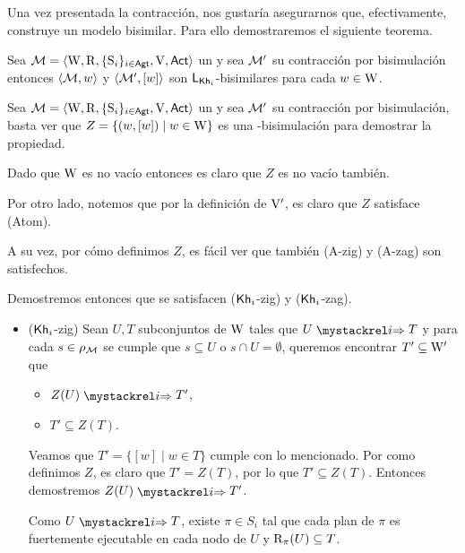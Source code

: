 Una vez presentada la contracción, nos gustaría asegurarnos que, efectivamente, construye un modelo bisimilar. Para ello demostraremos el 
siguiente teorema.

\begin{teorema}
    Sea $\mathcal{M}=\langle \mathrm{W},\mathrm{R},\{ \mathrm{S}_i \}_{i \in {\rm \sf Agt}},\mathrm{V},{\rm \sf Act} \rangle$ un \ults y sea $\mathcal{M}'$ su contracción por bisimulación entonces 
    $\langle \mathcal{M},w \rangle$ y $\langle \mathcal{M}',[w] \rangle$ son $\mathsf{L}_{\mathsf{Kh}_i}$-bisimilares para cada $w \in \mathrm{W}$.
\end{teorema}

\begin{demostracion}
    Sea $\mathcal{M}=\langle \mathrm{W},\mathrm{R},\{ \mathrm{S}_i \}_{i \in {\rm \sf Agt}},\mathrm{V},{\rm \sf Act} \rangle$ un \ults
    y sea $\mathcal{M}'$ su contracción por bisimulación, basta ver que $Z = \{(w,[w]) \mid w \in\mathrm{W}\}$ es una \KHilogic-bisimulación para demostrar la propiedad.

    Dado que $\mathrm{W}$ es no vacío entonces es claro que $Z$ es no vacío también.

    Por otro lado, notemos que por la definición de $\mathrm{V}'$, es claro que $Z$ satisface (Atom).

    A su vez, por cómo definimos $Z$, es fácil ver que también (A-zig) y (A-zag) son satisfechos.
    
    Demostremos entonces que se satisfacen ($\mathsf{Kh}_i$-zig) y ($\mathsf{Kh}_i$-zag).

    \begin{itemize}
        \item ($\mathsf{Kh}_i$-zig) Sean $U, T$ subconjuntos de $\mathrm{W}$ tales que $U \ultsExecAgi T$ y para cada $s \in \rho_{\mathcal{M}}$ se cumple que 
        $s \subseteq U$ o $s \cap U = \emptyset$, queremos encontrar $T' \subseteq \mathrm{W}'$ que

        \begin{multicols}{2}
            \begin{itemize}
                \item $Z(U) \ultsExecAgi T'$, 
                \item $T' \subseteq Z(T)$.
            \end{itemize}
        \end{multicols}

        Veamos que $T' = \{ [w] \mid w \in T\}$ cumple con lo mencionado. Por como definimos $Z$, es claro que $T'  = Z(T)$, por lo que 
        $T' \subseteq Z(T)$. Entonces demostremos $Z(U) \ultsExecAgi T'$.

        Como $U \ultsExecAgi T$, existe $\pi \in S_i$ tal que cada plan de $\pi$ es fuertemente ejecutable en cada nodo de $U$ y 
        $\mathrm{R}_\pi(U) \subseteq T$. 


\end{itemize}
\end{demostracion}
